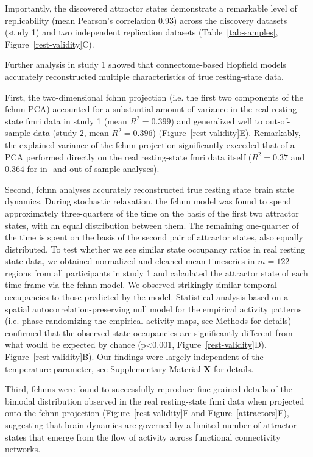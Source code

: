 \documentclass{article}
\begin{document}
Importantly, the discovered attractor states demonstrate a remarkable level of replicability (mean Pearson's
correlation 0.93) across the discovery datasets (study 1) and two independent replication datasets
(Table~\ref{tab-samples}, Figure~\ref{rest-validity}C).

Further analysis in study 1 showed that connectome-based Hopfield models accurately reconstructed multiple
characteristics of true resting-state data.

First, the two-dimensional \acrshort{fchnn} projection (i.e. the first two components of the \acrshort{fchnn}-PCA) accounted for a substantial amount of variance in the real resting-state \acrshort{fmri} data in study 1 (mean $R^2=0.399$) and generalized well to out-of-sample data (study 2, mean $R^2=0.396$)  (Figure~\ref{rest-validity}E). Remarkably, the explained variance of the \acrshort{fchnn} projection significantly exceeded that of a PCA performed directly on the real resting-state \acrshort{fmri} data itself ($R^2=0.37$ and $0.364$ for in- and out-of-sample analyses).

Second, \acrshort{fchnn} analyses accurately reconstructed true resting state brain state dynamics. During stochastic relaxation, the \acrshort{fchnn} model was found to spend approximately three-quarters of the time on the basis of the first two attractor states, with an equal distribution between them. The remaining one-quarter of the time is spent on the basis of the second pair of attractor states, also equally distributed. To test whether we see similar state occupancy ratios in real resting state data, we obtained normalized and cleaned mean timeseries in $m=122$ regions from all participants in study 1 and calculated
the attractor state of each time-frame via the \acrshort{fchnn} model. We observed strikingly similar temporal occupancies to those predicted by the model. Statistical analysis based on a spatial autocorrelation-preserving null model for the empirical activity patterns (i.e. phase-randomizing the empirical activity maps, see Methods for details) confirmed that the observed state occupancies are significantly different from what would be expected by chance (p\textless 0.001, Figure~\ref{rest-validity}D).
Figure~\ref{rest-validity}B). Our findings were largely independent of the temperature parameter, see Supplementary Material \textbf{X} for details.

Third, \acrshort{fchnn}s were found to successfully reproduce fine-grained details of the bimodal distribution observed in the real resting-state \acrshort{fmri} data when projected onto the \acrshort{fchnn} projection (Figure~\ref{rest-validity}F and Figure~\ref{attractors}E), suggesting that brain dynamics are governed by a limited number of attractor states that emerge from the flow of activity across functional connectivity networks.
\end{document}
